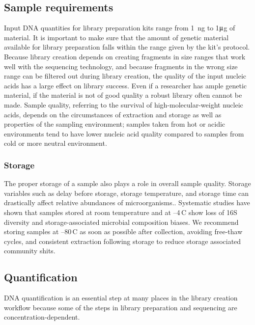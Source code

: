 \documentclass[graybox]{svmult}
\begin{document}
\subsection{Sample requirements }
\label{subsec:4}
%
Input DNA quantities for library preparation kits range from 1~ng to  1$\umu$g of material. It is important to make sure that the amount of genetic material available for library preparation falls within the range given by the kit's protocol.
%
Because library creation depends on creating fragments in size ranges that work well with the sequencing technology, and because fragments in the wrong size range can be filtered out during library creation,  the quality of the input nucleic acids has a large effect on library success. 
Even if a researcher has ample genetic material, if the material is not of good quality a robust library often cannot be made. 
Sample quality, referring to the survival of high-molecular-weight nucleic acids, depends on the circumstances of extraction and storage as well as properties of the sampling environment; samples taken from hot or acidic environments tend to have lower nucleic acid quality compared to samples from cold or more neutral environment.

\subsubsection{Storage}
The proper storage of a sample also plays a role in overall sample quality.  Storage variables such as delay before storage, storage temperature, and storage time can drastically affect relative abundances of microorganisms.. Systematic studies have shown that samples stored at room temperature and at --4\degree\,C show loss of 16S diversity and storage-associated microbial composition biases\cite{Rubin2013Investigating}.  We recommend storing samples at --80\degree\,C as soon as possible after collection, avoiding free-thaw cycles, and consistent extraction following storage to reduce storage associated community shits.  

\subsection{Quantification}
DNA quantification is an essential step at many places in the library creation workflow because some of the steps in library preparation and sequencing are concentration-dependent.
\end{document}
